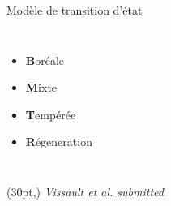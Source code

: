 \documentclass[11pt, compress, aspectratio=1610]{beamer}
\newcommand\smallcitation[1]{%
\begin{textblock*}{\textwidth}(30pt,\textheight)
	\raggedleft \footnotesize\textit{#1}
\end{textblock*}}
\newcommand{\begincols}{\begin{columns}}
\newcommand{\stopcols}{\end{columns}}
\begin{document}
\begin{frame}{Modèle de transition d’état}
\protect\hypertarget{moduxe8le-de-transition-duxe9tat}{}

\begincols
{}
  
\hfill{}
\vspace{-5mm}

\begin{itemize}
    \item
      \textbf{\textcolor{cB}{B}}oréale
    \item
      \textbf{\textcolor{cM}{M}}ixte
    \item
      \textbf{\textcolor{cT}{T}}empérée
    \item
    \textbf{\textcolor{cR}{R}}égeneration
  \end{itemize}

\stopcols

\smallcitation{Vissault et al. submitted}

\end{frame}
\end{document}
